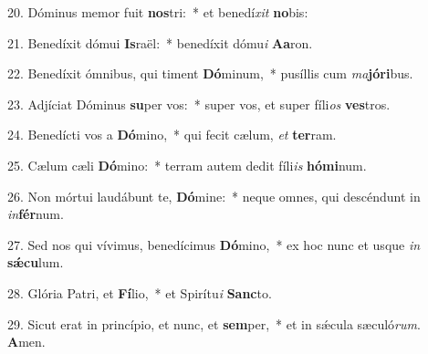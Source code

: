 20. Dóminus memor fuit \textbf{nos}tri:~*  et benedí\textit{xit} \textbf{no}bis:\

21. Benedíxit dómui \textbf{Is}raël:~*  benedíxit dómu\textit{i} \textbf{A}\textbf{a}ron.\

22. Benedíxit ómnibus, qui timent \textbf{Dó}minum,~*  pusíllis cum \textit{ma}\textbf{jó}\textbf{ri}bus.\

23. Adjíciat Dóminus \textbf{su}per vos:~*  super vos, et super fíli\textit{os} \textbf{ves}tros.\

24. Benedícti vos a \textbf{Dó}mino,~*  qui fecit cælum, \textit{et} \textbf{ter}ram.\

25. Cælum cæli \textbf{Dó}mino:~*  terram autem dedit fíli\textit{is} \textbf{hó}\textbf{mi}num.\

26. Non mórtui laudábunt te, \textbf{Dó}mine:~*  neque omnes, qui descéndunt in \textit{in}\textbf{fér}num.\

27. Sed nos qui vívimus, benedícimus \textbf{Dó}mino,~*  ex hoc nunc et usque \textit{in} \textbf{sǽ}\textbf{cu}lum.\

28. Glória Patri, et \textbf{Fí}lio,~*  et Spirítu\textit{i} \textbf{Sanc}to.\

29. Sicut erat in princípio, et nunc, et \textbf{sem}per,~*  et in sǽcula sæculó\textit{rum}. \textbf{A}men.\

